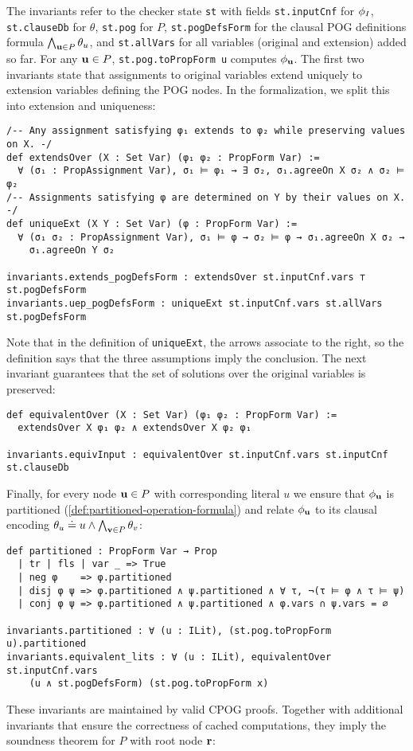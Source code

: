 The invariants refer to the checker state \lstinline{st} with fields \lstinline{st.inputCnf} for $\phi_I$, \lstinline{st.clauseDb} for $\theta$, \lstinline{st.pog} for $P$, \lstinline{st.pogDefsForm} for the clausal POG definitions formula $\bigwedge_{\mathbf{u}\in P}\theta_u$, and \lstinline{st.allVars} for all variables (original and extension) added so far. For any $\mathbf{u}\in P$, \lstinline{st.pog.toPropForm u} computes $\phi_{\mathbf{u}}$. The first two invariants state that assignments to original variables extend uniquely to extension variables defining the POG nodes. In the formalization, we split this into extension and uniqueness:
\begin{lstlisting}
/-- Any assignment satisfying φ₁ extends to φ₂ while preserving values on X. -/
def extendsOver (X : Set Var) (φ₁ φ₂ : PropForm Var) :=
  ∀ (σ₁ : PropAssignment Var), σ₁ ⊨ φ₁ → ∃ σ₂, σ₁.agreeOn X σ₂ ∧ σ₂ ⊨ φ₂
/-- Assignments satisfying φ are determined on Y by their values on X. -/
def uniqueExt (X Y : Set Var) (φ : PropForm Var) :=
  ∀ (σ₁ σ₂ : PropAssignment Var), σ₁ ⊨ φ → σ₂ ⊨ φ → σ₁.agreeOn X σ₂ →
    σ₁.agreeOn Y σ₂

invariants.extends_pogDefsForm : extendsOver st.inputCnf.vars ⊤ st.pogDefsForm
invariants.uep_pogDefsForm : uniqueExt st.inputCnf.vars st.allVars st.pogDefsForm
\end{lstlisting}
Note that in the definition of \lstinline{uniqueExt}, the arrows associate to the right,
so the definition says that the three assumptions imply the conclusion.
The next invariant guarantees that the set of solutions over the original variables is preserved:
\begin{lstlisting}
def equivalentOver (X : Set Var) (φ₁ φ₂ : PropForm Var) :=
  extendsOver X φ₁ φ₂ ∧ extendsOver X φ₂ φ₁

invariants.equivInput : equivalentOver st.inputCnf.vars st.inputCnf st.clauseDb
\end{lstlisting}
Finally, for every node $\mathbf{u}\in P$ with corresponding literal $u$ we ensure that $\phi_{\mathbf{u}}$ is partitioned (\cref{def:partitioned-operation-formula}) and relate $\phi_{\mathbf{u}}$ to its clausal encoding $\theta_u \doteq u \wedge \bigwedge_{\mathbf{v}\in P}\theta_v$:
\begin{lstlisting}
def partitioned : PropForm Var → Prop
  | tr | fls | var _ => True
  | neg φ    => φ.partitioned
  | disj φ ψ => φ.partitioned ∧ ψ.partitioned ∧ ∀ τ, ¬(τ ⊨ φ ∧ τ ⊨ ψ)
  | conj φ ψ => φ.partitioned ∧ ψ.partitioned ∧ φ.vars ∩ ψ.vars = ∅

invariants.partitioned : ∀ (u : ILit), (st.pog.toPropForm u).partitioned
invariants.equivalent_lits : ∀ (u : ILit), equivalentOver st.inputCnf.vars
    (u ∧ st.pogDefsForm) (st.pog.toPropForm x)
\end{lstlisting}
These invariants are maintained by valid CPOG proofs. Together with additional invariants
that ensure the correctness of cached computations, they imply the soundness theorem for $P$ with root
node $\mathbf{r}$:

